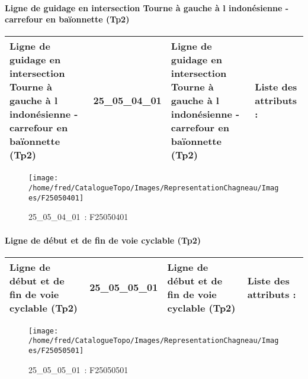 \documentclass[12pt,titlepage,oneside]{book}
\begin{document}
\paragraph{Ligne de guidage en intersection Tourne à gauche à l indonésienne - carrefour en baïonnette (Tp2)}
\noindent
\vspace{\baselineskip}

\renewcommand{\arraystretch}{1.2}
\begin{supertabular}{|p{10cm}|c|p{13cm}|p{12cm}|}
 Ligne de guidage en intersection Tourne à gauche à l indonésienne - carrefour en baïonnette (Tp2) & 25\_05\_04\_01 & Ligne de guidage en intersection Tourne à gauche à l indonésienne - carrefour en baïonnette (Tp2) & Liste des attributs :
\begin{enumerate}
\end{enumerate}
\\
\hline
\end{supertabular}
\begin{figure}[h!]
  \hfill         %
  \begin{minipage}[t]{3cm}
    \begin{center}
      \texttt{[image: /home/fred/CatalogueTopo/Images/RepresentationChagneau/Images/F25050401]}
      \caption[~25\_05\_04\_01]{\small{25\_05\_04\_01~:} \tiny{F25050401}}\label{F25050401}
    \end{center}
  \end{minipage}
\end{figure}


\paragraph{Ligne de début et de fin de voie cyclable (Tp2)}
\noindent
\vspace{\baselineskip}

\renewcommand{\arraystretch}{1.2}
\begin{supertabular}{|p{10cm}|c|p{13cm}|p{12cm}|}
 Ligne de début et de fin de voie cyclable (Tp2) & 25\_05\_05\_01 & Ligne de début et de fin de voie cyclable (Tp2) & Liste des attributs :
\begin{enumerate}
\end{enumerate}
\\
\hline
\end{supertabular}
\begin{figure}[h!]
  \hfill         %
  \begin{minipage}[t]{3cm}
    \begin{center}
      \texttt{[image: /home/fred/CatalogueTopo/Images/RepresentationChagneau/Images/F25050501]}
      \caption[~25\_05\_05\_01]{\small{25\_05\_05\_01~:} \tiny{F25050501}}\label{F25050501}
    \end{center}
  \end{minipage}
\end{figure}
\end{document}
